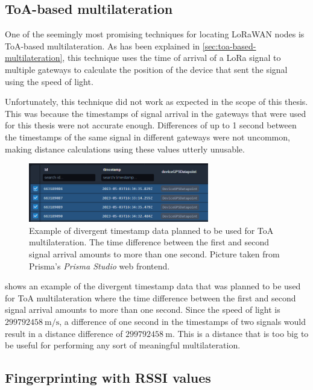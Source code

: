 \subsection{\acf{ToA}-based multilateration}

One of the seemingly most promising techniques for locating \ac{LoRaWAN} nodes is \ac{ToA}-based multilateration.
As has been explained in \cref{sec:toa-based-multilateration}, this technique uses the time of arrival of a \ac{LoRa} signal to multiple gateways to calculate the position of the device that sent the signal using the speed of light.

Unfortunately, this technique did not work as expected in the scope of this thesis.
This was because the timestamps of signal arrival in the gateways that were used for this thesis were not accurate enough.
Differences of up to 1 second between the timestamps of the same signal in different gateways were not uncommon, making distance calculations using these values utterly unusable.

\begin{figure}
    \centering
    \includegraphics[width=0.7\textwidth]{pictures/multilateration/toa_bad_data_example_prisma_studio.png}
    \caption{Example of divergent timestamp data planned to be used for \ac{ToA} multilateration. The time difference between the first and second signal arrival amounts to more than one second. Picture taken from Prisma's \emph{Prisma Studio} web frontend.\label{fig:toa-bad-data-example}}
\end{figure}

 shows an example of the divergent timestamp data that was planned to be used for \ac{ToA} multilateration where the time difference between the first and second signal arrival amounts to more than one second.
Since the speed of light is $299792458\ \mathrm{m/s}$, a difference of one second in the timestamps of two signals would result in a distance difference of $299792458\ \mathrm{m}$.
This is a distance that is too big to be useful for performing any sort of meaningful multilateration.


\subsection{Fingerprinting with \acs{RSSI} values}\label{sec:fingerprinting-with-rssi-values}

